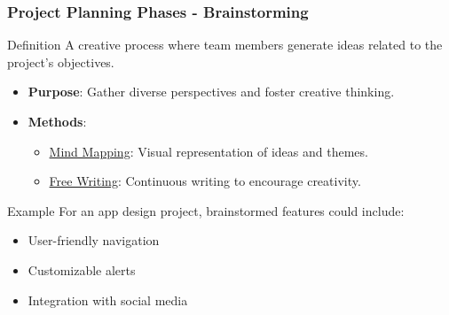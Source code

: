 \documentclass[aspectratio=169]{beamer}
\begin{document}
\begin{frame}[fragile]
    \frametitle{Project Planning Phases - Brainstorming}
    \begin{block}{Definition}
        A creative process where team members generate ideas related to the project’s objectives.
    \end{block}
    \begin{itemize}
        \item \textbf{Purpose}: Gather diverse perspectives and foster creative thinking.
        \item \textbf{Methods}:
        \begin{itemize}
            \item \underline{Mind Mapping}: Visual representation of ideas and themes.
            \item \underline{Free Writing}: Continuous writing to encourage creativity.
        \end{itemize}
    \end{itemize}
    \begin{block}{Example}
        For an app design project, brainstormed features could include:
        \begin{itemize}
            \item User-friendly navigation
            \item Customizable alerts
            \item Integration with social media
        \end{itemize}
    \end{block}
\end{frame}
\end{document}

